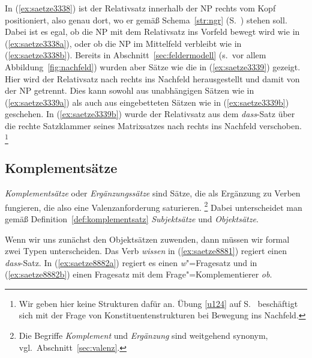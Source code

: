 In (\ref{ex:saetze3338}) ist der Relativsatz innerhalb der NP rechts vom Kopf positioniert, also genau dort, wo er gemäß Schema~\ref{str:ngr} (S.~\pageref{str:ngr}) stehen soll.
Dabei ist es egal, ob die NP mit dem Relativsatz ins Vorfeld bewegt wird wie in (\ref{ex:saetze3338a}), oder ob die NP im Mittelfeld verbleibt wie in (\ref{ex:saetze3338b}).
Bereits in Abschnitt~\ref{sec:feldermodell} (s.\ vor allem Abbildung~\ref{fig:nachfeld}) wurden aber Sätze wie die in (\ref{ex:saetze3339}) gezeigt.
Hier wird der Relativsatz nach rechts ins Nachfeld herausgestellt und damit von der NP getrennt.
Dies kann sowohl aus unabhängigen Sätzen wie in (\ref{ex:saetze3339a}) als auch aus eingebetteten Sätzen wie in (\ref{ex:saetze3339b}) geschehen.
In (\ref{ex:saetze3339b}) wurde der Relativsatz aus dem \textit{dass}-Satz über die rechte Satzklammer seines Matrixsatzes nach rechts ins Nachfeld verschoben.%
\footnote{Wir geben hier keine Strukturen dafür an.
Übung \ref{u124} auf S.~\pageref{u124} beschäftigt sich mit der Frage von Konstituentenstrukturen bei Bewegung ins Nachfeld.}

\subsection{Komplementsätze}

\label{sec:komplementsaetze}

\textit{Komplementsätze} oder \textit{Ergänzungssätze} sind Sätze, die als Ergänzung zu Verben fungieren, die also eine Valenzanforderung saturieren.%
\footnote{Die Begriffe \textit{Komplement} und \textit{Ergänzung} sind weitgehend synonym, vgl.\ Abschnitt~\ref{sec:valenz}.}
Dabei unterscheidet man gemäß Definition~\ref{def:komplementsatz} \textit{Subjektsätze} und \textit{Objektsätze}.


Wenn wir uns zunächst den Objektsätzen zuwenden, dann müssen wir formal zwei Typen unterscheiden.
Das Verb \textit{wissen} in (\ref{ex:saetze8881}) regiert einen \textit{dass}-Satz.
In (\ref{ex:saetze8882a}) regiert es einen \textit{w}"=Fragesatz und in (\ref{ex:saetze8882b}) einen Fragesatz mit dem Frage"=Komplementierer \textit{ob}.

